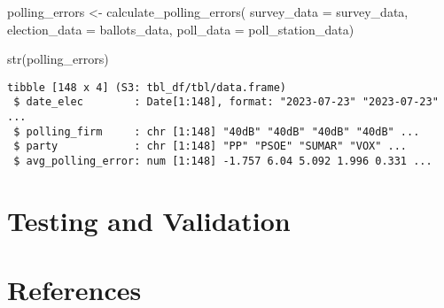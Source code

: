 \documentclass[
  letterpaper,
  DIV=11,
  numbers=noendperiod]{scrreprt}
\newenvironment{Shaded}{\begin{snugshade}}{\end{snugshade}}
\newcommand{\AttributeTok}[1]{\textcolor[rgb]{0.40,0.45,0.13}{#1}}
\newcommand{\FunctionTok}[1]{\textcolor[rgb]{0.28,0.35,0.67}{#1}}
\newcommand{\NormalTok}[1]{\textcolor[rgb]{0.00,0.23,0.31}{#1}}
\newcommand{\OtherTok}[1]{\textcolor[rgb]{0.00,0.23,0.31}{#1}}
\begin{document}
\begin{Shaded}
\begin{Highlighting}[]
\NormalTok{polling\_errors }\OtherTok{\textless{}{-}} \FunctionTok{calculate\_polling\_errors}\NormalTok{(}
  \AttributeTok{survey\_data =}\NormalTok{  survey\_data,}
  \AttributeTok{election\_data =}\NormalTok{ ballots\_data,}
  \AttributeTok{poll\_data =}\NormalTok{ poll\_station\_data)}
\end{Highlighting}
\end{Shaded}

\begin{Shaded}
\begin{Highlighting}[]
\FunctionTok{str}\NormalTok{(polling\_errors)}
\end{Highlighting}
\end{Shaded}

\begin{verbatim}
tibble [148 x 4] (S3: tbl_df/tbl/data.frame)
 $ date_elec        : Date[1:148], format: "2023-07-23" "2023-07-23" ...
 $ polling_firm     : chr [1:148] "40dB" "40dB" "40dB" "40dB" ...
 $ party            : chr [1:148] "PP" "PSOE" "SUMAR" "VOX" ...
 $ avg_polling_error: num [1:148] -1.757 6.04 5.092 1.996 0.331 ...
\end{verbatim}


\hypertarget{testing-and-validation}{%
\chapter{Testing and Validation}\label{testing-and-validation}}


\hypertarget{references}{%
\chapter*{References}\label{references}}

\end{document}
